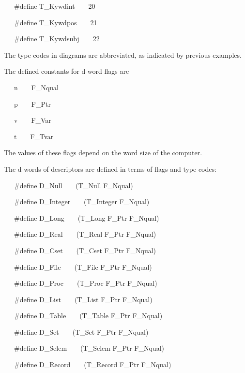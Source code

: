 {\ttfamily\mdseries
\ \ \ \#define T\_Kywdint\ \ \ \ 20}

{\ttfamily\mdseries
\ \ \ \#define T\_Kywdpos\ \ \ \ 21}

{\ttfamily\mdseries
\ \ \ \#define T\_Kywdsubj\ \ \ \ 22}


The type codes in diagrams are abbreviated, as indicated by previous examples.


The defined constants for d-word flags are

{\ttfamily\mdseries
\ \ \ n\ \ \ \ F\_Nqual}

{\ttfamily\mdseries
\ \ \ p\ \ \ \ F\_Ptr}

{\ttfamily\mdseries
\ \ \ v\ \ \ \ F\_Var}

{\ttfamily\mdseries
\ \ \ t\ \ \ \ F\_Tvar}

The values of these flags depend on the word size of the computer.


The d-words of descriptors are defined in terms of flags and type codes:

{\ttfamily\mdseries
\ \ \ \#define D\_Null\ \ \ \ (T\_Null {\textbar} F\_Nqual)}

{\ttfamily\mdseries
\ \ \ \#define D\_Integer\ \ \ \ (T\_Integer {\textbar} F\_Nqual)}

{\ttfamily\mdseries
\ \ \ \#define D\_Long\ \ \ \ (T\_Long {\textbar} F\_Ptr {\textbar} F\_Nqual)}

{\ttfamily\mdseries
\ \ \ \#define D\_Real\ \ \ \ (T\_Real {\textbar} F\_Ptr {\textbar} F\_Nqual)}

{\ttfamily\mdseries
\ \ \ \#define D\_Cset\ \ \ \ (T\_Cset {\textbar} F\_Ptr {\textbar} F\_Nqual)}

{\ttfamily\mdseries
\ \ \ \#define D\_File\ \ \ \ (T\_File {\textbar} F\_Ptr {\textbar} F\_Nqual)}

{\ttfamily\mdseries
\ \ \ \#define D\_Proc\ \ \ \ (T\_Proc {\textbar} F\_Ptr {\textbar} F\_Nqual)}

{\ttfamily\mdseries
\ \ \ \#define D\_List\ \ \ \ (T\_List {\textbar} F\_Ptr {\textbar} F\_Nqual)}

{\ttfamily\mdseries
\ \ \ \#define D\_Table\ \ \ \ (T\_Table {\textbar} F\_Ptr {\textbar} F\_Nqual)}

{\ttfamily\mdseries
\ \ \ \#define D\_Set\ \ \ \ (T\_Set {\textbar} F\_Ptr {\textbar} F\_Nqual)}

{\ttfamily\mdseries
\ \ \ \#define D\_Selem\ \ \ \ (T\_Selem {\textbar} F\_Ptr {\textbar} F\_Nqual)}

{\ttfamily\mdseries
\ \ \ \#define D\_Record\ \ \ \ (T\_Record {\textbar} F\_Ptr {\textbar} F\_Nqual)}

